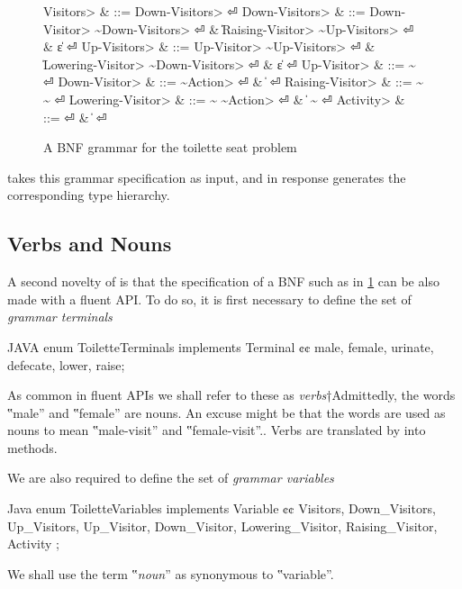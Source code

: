 \begin{figure}[H]
  \begin{Grammar}
    \begin{aligned}
      \<Visitors> & ::= \<Down-Visitors> \hfill⏎
      \<Down-Visitors> & ::= \<Down-Visitor> \~\<Down-Visitors> \hfill⏎
      {} & \| \<Raising-Visitor> \~\<Up-Visitors> \hfill⏎
      {} & \| ε \hfill⏎
      \<Up-Visitors> & ::= \<Up-Visitor> \~\<Up-Visitors> \hfill⏎
      {} & \| \<Lowering-Visitor> \~\<Down-Visitors> \hfill⏎
      {} & \| ε \hfill⏎
      \<Up-Visitor> & ::=  \~ \hfill⏎
      \<Down-Visitor> & ::=  \~\<Action> \hfill⏎
                          & \|   \hfill⏎
      \<Raising-Visitor> & ::=  \~ \~ \hfill⏎
      \<Lowering-Visitor> & ::=  \~ \~\<Action> \hfill⏎
                          & \|  \~  \hfill⏎
      \<Activity> & ::=  \hfill⏎
                          & \|  \hfill⏎
    \end{aligned}
  \end{Grammar}
  \caption{A BNF grammar for the toilette seat problem}
  \label{figure:BNF}
\end{figure}

\Self takes this grammar specification as input, and in response
  generates the corresponding
  \Java type hierarchy.

\subsection{Verbs and Nouns}
A second novelty of \Self is that the specification of a BNF such as in
  \cref{figure:BNF} can be also made with a \Java fluent API\@.
To do so, it is first necessary to
  define the set of \emph{grammar terminals}
  \begin{code}{JAVA}
enum ToiletteTerminals implements Terminal {¢¢
  male, female,
  urinate, defecate,
  lower, raise;
}
\end{code}
As common in fluent APIs we shall refer to these
as \emph{verbs}†{Admittedly, the words ‟male” and ‟female” are nouns.
  An excuse might be that the words are used as nouns to mean ‟male-visit” and ‟female-visit”.}.
Verbs are translated by \Self into methods.

We are also required to define the set of \emph{grammar variables}
\begin{code}{Java}
enum ToiletteVariables implements Variable {¢¢
  Visitors, Down_Visitors, Up_Visitors,
  Up_Visitor, Down_Visitor,
  Lowering_Visitor, Raising_Visitor,
  Activity
};
\end{code}
  We shall use the term ‟\emph{noun}” as synonymous to ‟variable”.


